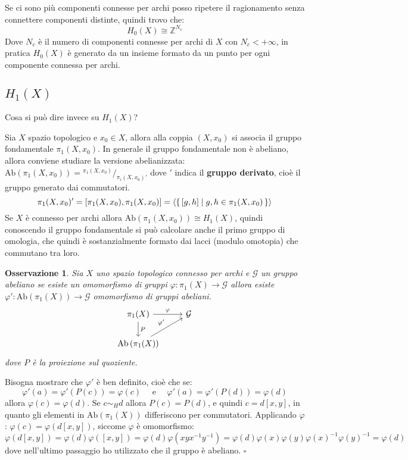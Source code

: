 \documentclass[10pt, twoside=false, x11names]{scrbook}
\newtheorem{osservation}[theorem]{Osservazione}
\newenvironment{proof}{{\textbf{Dimostrazione}:}}{\hfill $\square$}
\newcommand{\Z}{\mathbb{Z}}
\renewcommand{\phi}{\varphi}
\newcommand{\Ab}[1]{\mathrm{Ab}\left( #1 \right)}
\newcommand*\quot[2]{{^{\textstyle #1}\big/_{\textstyle #2}}}
\begin{document}
Se ci sono più componenti connesse per archi posso ripetere il ragionamento senza connettere componenti
distinte, quindi trovo che:
\[
  H_0(X) \cong \Z^{N_c}
\]
Dove $ N_c $ è il numero di componenti connesse per archi di $ X $ con $ N_c < + \infty $, in pratica
$ H_0(X) $ è generato da un insieme formato da un punto per ogni componente connessa per archi.

\subsection{$ H_1(X) $}

Cosa si può dire invece su $ H_1(X) $?

Sia $ X $ spazio topologico e $ x_0 \in X $, allora alla coppia $ (X, x_0) $ si associa il gruppo fondamentale
$ \pi_1(X,x_0) $. In generale il gruppo fondamentale non è abeliano, allora conviene studiare la versione abelianizzata:
$ \Ab{\pi_1(X,x_0)} = \quot{\pi_1(X,x_0)}{\pi_i(X,x_0)'} $ dove $ ' $ indica il \textbf{gruppo derivato}, cioè il gruppo
generato dai commutatori.
\[
  \pi_1(X,x_0)' = [\pi_1(X,x_0), \pi_1(X,x_0)] = \langle\set{[g,h] | g,h \in \pi_1(X,x_0)}\rangle
\]
Se $ X $ è connesso per archi allora $ \Ab{\pi_1(X,x_0)} \cong H_1(X) $, quindi conoscendo il gruppo fondamentale si può calcolare anche
il primo gruppo di omologia, che quindi è sostanzialmente formato dai lacci (modulo omotopia) che commutano tra loro.


\begin{osservation}
  Sia $ X $ uno spazio topologico connesso per archi e $ \mathcal{G} $ un gruppo abeliano se esiste un omomorfismo
  di gruppi $ \phi: \pi_1(X) \to \mathcal{G} $ allora esiste $ \phi' : \Ab{\pi_1(X)} \to \mathcal{G} $ omomorfismo di gruppi abeliani.
  \[
    \begin{tikzcd}
      \pi_1(X) \arrow{r}{\phi} \arrow{d}{P} & \mathcal{G} \\
      \Ab{\pi_1(X)} \arrow{ur}{\phi'}
    \end{tikzcd}
  \]
  dove $ P $ è la proiezione sul quoziente.
\end{osservation}
\begin{proof}
  Bisogna mostrare che $ \phi' $ è ben definito, cioè che se:
  \[
    \phi'(a) = \phi'(P(c)) = \phi(c) \quad \text{ e } \quad \phi'(a) = \phi'(P(d)) = \phi(d)
  \]
  allora $ \phi(c) = \phi(d) $. Se $ c \sim_H d $ allora $ P(c) = P(d) $,
  e quindi $ c = d[x,y] $, in quanto gli elementi in $ \Ab{\pi_1(X)} $
  differiscono per commutatori. Applicando $ \phi $: $ \phi(c) = \phi(d[x,y]) $,
  siccome $ \phi $ è omomorfismo:
  \[
    \phi(d[x,y]) = \phi(d)\phi([x,y]) = \phi(d) \phi(xyx^{-1}y^{-1}) = \phi(d) \phi(x) \phi(y) \phi(x)^{-1} \phi(y)^{-1} = \phi(d)
  \]
  dove nell'ultimo passaggio ho utilizzato che il gruppo è abeliano.
\end{proof}
\end{document}
